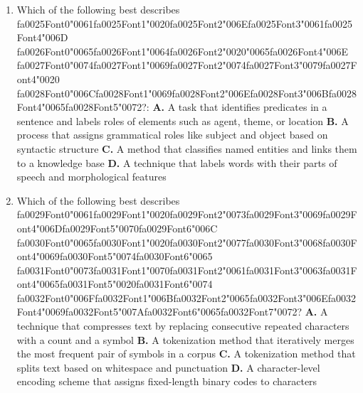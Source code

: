 \documentclass[11pt]{article}
\begin{document}
\begin{enumerate}[leftmargin=*]
  \item Which of the following best describes {\csname fa0025Font0\endcsname\char"0061}{\csname fa0025Font1\endcsname\char"0020}{\csname fa0025Font2\endcsname\char"006E}{\csname fa0025Font3\endcsname\char"0061}{\csname fa0025Font4\endcsname\char"006D} {\csname fa0026Font0\endcsname\char"0065}{\csname fa0026Font1\endcsname\char"0064}{\csname fa0026Font2\endcsname\char"0020}{\char"0065}{\csname fa0026Font4\endcsname\char"006E} {\csname fa0027Font0\endcsname\char"0074}{\csname fa0027Font1\endcsname\char"0069}{\csname fa0027Font2\endcsname\char"0074}{\csname fa0027Font3\endcsname\char"0079}{\csname fa0027Font4\endcsname\char"0020} {\csname fa0028Font0\endcsname\char"006C}{\csname fa0028Font1\endcsname\char"0069}{\csname fa0028Font2\endcsname\char"006E}{\csname fa0028Font3\endcsname\char"006B}{\csname fa0028Font4\endcsname\char"0065}{\csname fa0028Font5\endcsname\char"0072}?:
    \textbf{A.} A task that identifies predicates in a sentence and labels roles of elements such as agent, theme, or location
    \textbf{B.} A process that assigns grammatical roles like subject and object based on syntactic structure
    \textbf{C.} A method that classifies named entities and links them to a knowledge base
    \textbf{D.} A technique that labels words with their parts of speech and morphological features

  \item Which of the following best describes {\csname fa0029Font0\endcsname\char"0061}{\csname fa0029Font1\endcsname\char"0020}{\csname fa0029Font2\endcsname\char"0073}{\csname fa0029Font3\endcsname\char"0069}{\csname fa0029Font4\endcsname\char"006D}{\csname fa0029Font5\endcsname\char"0070}{\csname fa0029Font6\endcsname\char"006C} {\csname fa0030Font0\endcsname\char"0065}{\csname fa0030Font1\endcsname\char"0020}{\csname fa0030Font2\endcsname\char"0077}{\csname fa0030Font3\endcsname\char"0068}{\csname fa0030Font4\endcsname\char"0069}{\csname fa0030Font5\endcsname\char"0074}{\csname fa0030Font6\endcsname\char"0065} {\csname fa0031Font0\endcsname\char"0073}{\csname fa0031Font1\endcsname\char"0070}{\csname fa0031Font2\endcsname\char"0061}{\csname fa0031Font3\endcsname\char"0063}{\csname fa0031Font4\endcsname\char"0065}{\csname fa0031Font5\endcsname\char"0020}{\csname fa0031Font6\endcsname\char"0074} {\csname fa0032Font0\endcsname\char"006F}{\csname fa0032Font1\endcsname\char"006B}{\csname fa0032Font2\endcsname\char"0065}{\csname fa0032Font3\endcsname\char"006E}{\csname fa0032Font4\endcsname\char"0069}{\csname fa0032Font5\endcsname\char"007A}{\csname fa0032Font6\endcsname\char"0065}{\csname fa0032Font7\endcsname\char"0072}?
    \textbf{A.} A technique that compresses text by replacing consecutive repeated characters with a count and a symbol
    \textbf{B.} A tokenization method that iteratively merges the most frequent pair of symbols in a corpus
    \textbf{C.} A tokenization method that splits text based on whitespace and punctuation
    \textbf{D.} A character-level encoding scheme that assigns fixed-length binary codes to characters


\end{enumerate}
\end{document}
